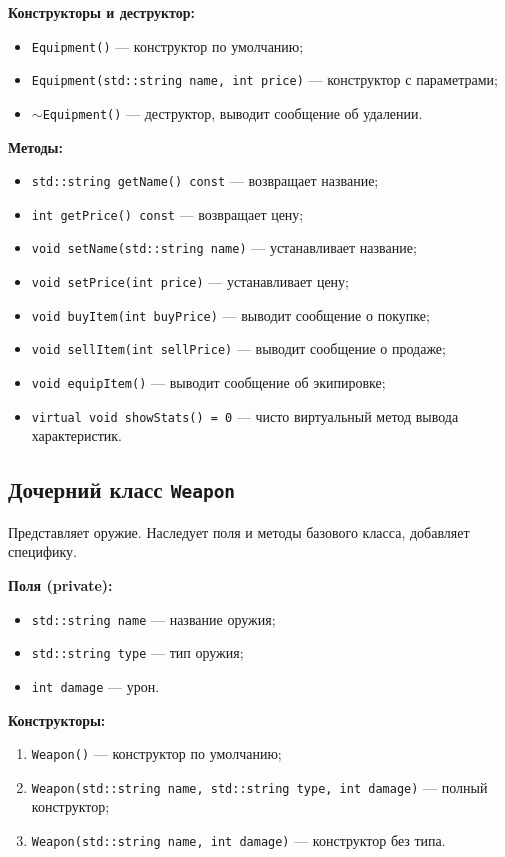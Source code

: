 \documentclass[oneside,a4paper,14pt]{extarticle}
\begin{document}
\textbf{Конструкторы и деструктор:}
\begin{itemize}
    \item \texttt{Equipment()} — конструктор по умолчанию;
    \item \texttt{Equipment(std::string name, int price)} — конструктор с параметрами;
    \item \texttt{$\sim$Equipment()} — деструктор, выводит сообщение об удалении.
\end{itemize}

\textbf{Методы:}
\begin{itemize}
    \item \texttt{std::string getName() const} — возвращает название;
    \item \texttt{int getPrice() const} — возвращает цену;
    \item \texttt{void setName(std::string name)} — устанавливает название;
    \item \texttt{void setPrice(int price)} — устанавливает цену;
    \item \texttt{void buyItem(int buyPrice)} — выводит сообщение о покупке;
    \item \texttt{void sellItem(int sellPrice)} — выводит сообщение о продаже;
    \item \texttt{void equipItem()} — выводит сообщение об экипировке;
    \item \texttt{virtual void showStats() = 0} — чисто виртуальный метод вывода характеристик.
\end{itemize}

\subsection*{Дочерний класс \texttt{Weapon}}
Представляет оружие. Наследует поля и методы базового класса, добавляет специфику.

\textbf{Поля (private):}
\begin{itemize}
    \item \texttt{std::string name} — название оружия;
    \item \texttt{std::string type} — тип оружия;
    \item \texttt{int damage} — урон.
\end{itemize}

\textbf{Конструкторы:}
\begin{enumerate}
    \item \texttt{Weapon()} — конструктор по умолчанию;
    \item \texttt{Weapon(std::string name, std::string type, int damage)} — полный конструктор;
    \item \texttt{Weapon(std::string name, int damage)} — конструктор без типа.
\end{enumerate}
\end{document}
